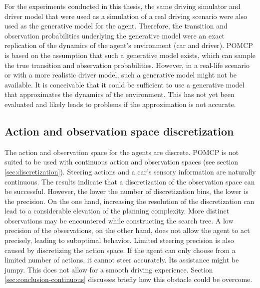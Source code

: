 For the experiments conducted in this thesis, the same driving simulator and driver model that were used as a simulation of a real driving scenario were also used as the generative model for the agent. Therefore, the transition and observation probabilities underlying the generative model were an exact replication of the dynamics of the agent's environment (car and driver). POMCP is based on the assumption that such a generative model exists, which can sample the true transition and observation probabilities. However, in a real-life scenario or with a more realistic driver model, such a generative model might not be available. It is conceivable that it could be sufficient to use a generative model that approximates the dynamics of the environment. This has not yet been evaluated and likely leads to problems if the approximation is not accurate.

\subsection{Action and observation space discretization}

The action and observation space for the agents are discrete. POMCP is not suited to be used with continuous action and observation spaces (see section \ref{sec:discretization}). Steering actions and a car's sensory information are naturally continuous. The results indicate that a discretization of the observation space can be successful. However, the lower the number of discretization bins, the lower is the precision. On the one hand, increasing the resolution of the discretization can lead to a considerable elevation of the planning complexity. More distinct observations may be encountered while constructing the search tree. A low precision of the observations, on the other hand, does not allow the agent to act precisely, leading to suboptimal behavior. Limited steering precision is also caused by discretizing the action space. If the agent can only choose from a limited number of actions, it cannot steer accurately. Its assistance might be jumpy. This does not allow for a smooth driving experience. Section \ref{sec:conclusion-continuous} discusses briefly how this obstacle could be overcome. 

